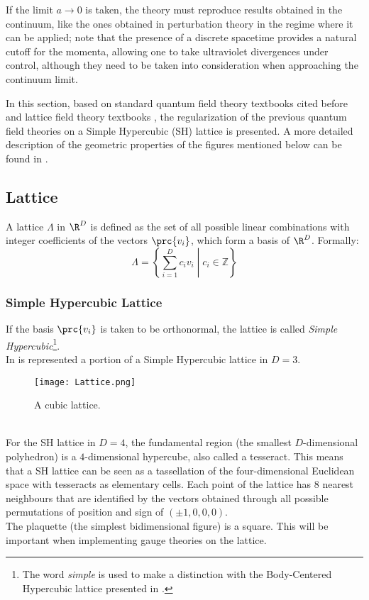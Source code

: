 If the limit $a\to0$ is taken, the theory must reproduce results obtained in the continuum, like the ones obtained in perturbation theory in the regime where it can be applied; note that the presence of a discrete spacetime provides a natural cutoff for the momenta, allowing one to take ultraviolet divergences under control, although they need to be taken into consideration when approaching the continuum limit.

In this section, based on standard quantum field theory textbooks cited before and lattice field theory textbooks \cite{Montvay:1994cy, Gattringer:2010zz, DeGrand:2006zz}, the regularization of the previous quantum field theories on a Simple Hypercubic (SH) lattice is presented.
A more detailed description of the geometric properties of the figures mentioned below can be found in \cite{coxeter2012regular}.

\subsection{Lattice}
A lattice $\Lambda$ in $\R^D$ is defined as the set of all possible linear combinations with integer coefficients of the vectors $\prc{v_i}$, which form a basis of $\R^D$.
Formally:
\begin{equation}
    \Lambda =\left\{\left.\sum _{i=1}^{D}c_{i}v_{i}\;\right\vert \;c_{i}\in \mathbb {Z} \right\} \label{1:genericLattice}
\end{equation}

\subsubsection{Simple Hypercubic Lattice\label{Sec1:SHLattice}}
If the basis $\prc{v_i}$ is taken to be orthonormal, the lattice is called \emph{Simple Hypercubic}\footnote{The word \emph{simple} is used to make a distinction with the Body-Centered Hypercubic lattice presented in .}.\\
In  is represented a portion of a Simple Hypercubic lattice in $D=3$.
\begin{figure}[!htbp]
    \centering
    \texttt{[image: Lattice.png]}
    \caption{A cubic lattice.}
    \label{1F:cubicLattice}
\end{figure}\\
For the SH lattice in $D=4$, the fundamental region (the smallest $D$-dimensional polyhedron) is a $4$-dimensional hypercube, also called a tesseract.
This means that a SH lattice can be seen as a tassellation of the four-dimensional Euclidean space with tesseracts as elementary cells.
Each point of the lattice has $8$ nearest neighbours that are identified by the vectors obtained through all possible permutations of position and sign of $(\pm1,0,0,0)$.\\
The plaquette (the simplest bidimensional figure) is a square.
This will be important when implementing gauge theories on the lattice.

